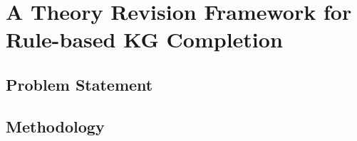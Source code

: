 \chapter{A Theory Revision Framework for Rule-based KG Completion}

\section{Problem Statement}

\section{Methodology}